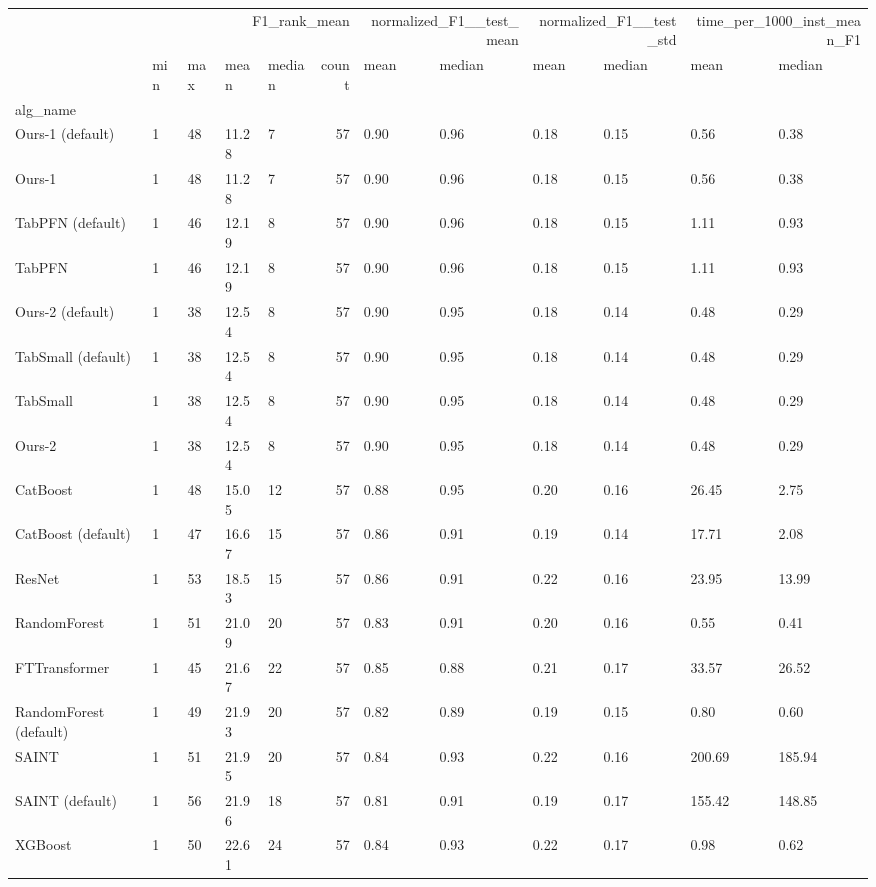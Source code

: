 \begin{tabular}{lllllrllllll}
\toprule
 & \multicolumn{5}{r}{F1_rank_mean} & \multicolumn{2}{r}{normalized_F1__test_mean} & \multicolumn{2}{r}{normalized_F1__test_std} & \multicolumn{2}{r}{time_per_1000_inst_mean_F1} \\
 & min & max & mean & median & count & mean & median & mean & median & mean & median \\
alg_name &  &  &  &  &  &  &  &  &  &  &  \\
\midrule
Ours-1 (default) & 1 & 48 & 11.28 & 7 & 57 & 0.90 & 0.96 & 0.18 & 0.15 & 0.56 & 0.38 \\
Ours-1 & 1 & 48 & 11.28 & 7 & 57 & 0.90 & 0.96 & 0.18 & 0.15 & 0.56 & 0.38 \\
TabPFN (default) & 1 & 46 & 12.19 & 8 & 57 & 0.90 & 0.96 & 0.18 & 0.15 & 1.11 & 0.93 \\
TabPFN & 1 & 46 & 12.19 & 8 & 57 & 0.90 & 0.96 & 0.18 & 0.15 & 1.11 & 0.93 \\
Ours-2 (default) & 1 & 38 & 12.54 & 8 & 57 & 0.90 & 0.95 & 0.18 & 0.14 & 0.48 & 0.29 \\
TabSmall (default) & 1 & 38 & 12.54 & 8 & 57 & 0.90 & 0.95 & 0.18 & 0.14 & 0.48 & 0.29 \\
TabSmall & 1 & 38 & 12.54 & 8 & 57 & 0.90 & 0.95 & 0.18 & 0.14 & 0.48 & 0.29 \\
Ours-2 & 1 & 38 & 12.54 & 8 & 57 & 0.90 & 0.95 & 0.18 & 0.14 & 0.48 & 0.29 \\
CatBoost & 1 & 48 & 15.05 & 12 & 57 & 0.88 & 0.95 & 0.20 & 0.16 & 26.45 & 2.75 \\
CatBoost (default) & 1 & 47 & 16.67 & 15 & 57 & 0.86 & 0.91 & 0.19 & 0.14 & 17.71 & 2.08 \\
ResNet & 1 & 53 & 18.53 & 15 & 57 & 0.86 & 0.91 & 0.22 & 0.16 & 23.95 & 13.99 \\
RandomForest & 1 & 51 & 21.09 & 20 & 57 & 0.83 & 0.91 & 0.20 & 0.16 & 0.55 & 0.41 \\
FTTransformer & 1 & 45 & 21.67 & 22 & 57 & 0.85 & 0.88 & 0.21 & 0.17 & 33.57 & 26.52 \\
RandomForest (default) & 1 & 49 & 21.93 & 20 & 57 & 0.82 & 0.89 & 0.19 & 0.15 & 0.80 & 0.60 \\
SAINT & 1 & 51 & 21.95 & 20 & 57 & 0.84 & 0.93 & 0.22 & 0.16 & 200.69 & 185.94 \\
SAINT (default) & 1 & 56 & 21.96 & 18 & 57 & 0.81 & 0.91 & 0.19 & 0.17 & 155.42 & 148.85 \\
XGBoost & 1 & 50 & 22.61 & 24 & 57 & 0.84 & 0.93 & 0.22 & 0.17 & 0.98 & 0.62 \\

\end{tabular}
